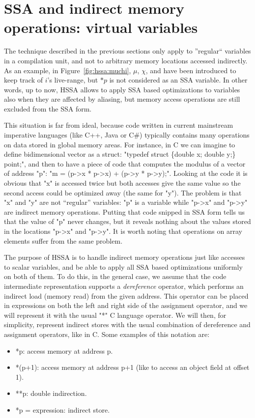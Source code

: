 \section{SSA and indirect memory operations: virtual variables}

The technique described in the previous sections only apply to ''regular`` variables in a compilation unit, and not to arbitrary memory locations accessed indirectly. As an example, in Figure~\ref{fig:hssa:muchi}, $\mu$, $\chi$, and \phifuns have been introduced to keep track of $i$'s live-range, but $*p$ is not considered as an SSA variable. 
In other words, up to now, HSSA allows to apply SSA based optimizations to variables also when they are affected by aliasing, but memory access operations are still excluded from the SSA form.

This situation is far from ideal, because code written in current mainstream imperative languages (like C++, Java or C\#) typically contains many operations on data stored in global memory areas.
For instance, in C we can imagine to define bidimensional vector as a struct: "typedef struct \{double x; double y;\} point;", and then to have a piece of code that computes the modulus of a vector of address "p": "m = (p-\textgreater x * p-\textgreater x) + (p-\textgreater y * p-\textgreater y);".
Looking at the code it is obvious that "x" is accessed twice but both accesses give the same value so the second access could be optimized away (the same for "y").
The problem is that "x" and "y" are not ``regular'' variables: "p" is a variable while "p-\textgreater x" and "p-\textgreater y" are indirect memory operations.
Putting that code snipped in SSA form tells us that the value of "p" never changes, but it reveals nothing about the values stored in the locations "p-\textgreater x" and "p-\textgreater y".
It is worth noting that operations on array elements suffer from the same problem.

The purpose of HSSA is to handle indirect memory operations just like accesses to scalar variables, and be able to apply all SSA based optimizations uniformly on both of them.
To do this, in the general case, we assume that the code intermediate representation supports a {\em dereference} operator, which performs an indirect load (memory read) from the given address. This operator can be placed in expressions on both the left and right side of the assignment operator, and we will represent it with the usual "*" C language operator. We will then, for simplicity, represent indirect stores with the usual combination of dereference and assignment operators, like in C.
Some examples of this notation are:
\begin{itemize}
\item *p: access memory at address p.
\item *(p+1): access memory at address p+1 (like to access an object field at offset 1).
\item **p: double indirection.
\item *p = expression: indirect store.
\end{itemize}

